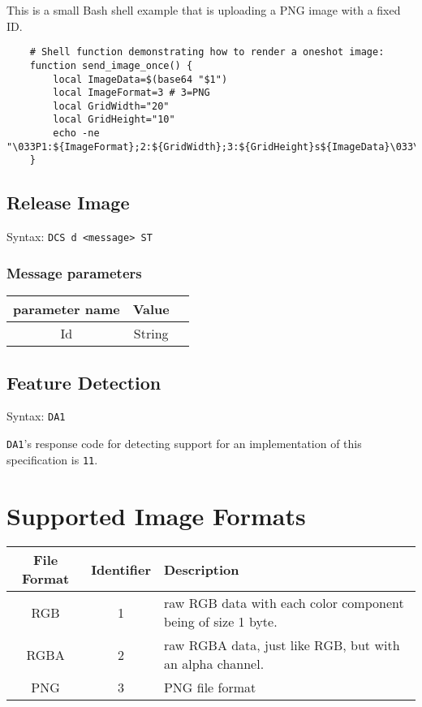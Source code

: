 \documentclass[a4paper]{article}
\newcommand{\code}[1]{\colorbox{light-gray}{\texttt{#1}}}
\newcommand{\DA}{\code{DA1}}
\begin{document}
This is a small Bash shell example that is uploading a PNG image with a fixed ID.

\begin{verbatim}
    # Shell function demonstrating how to render a oneshot image:
    function send_image_once() {
        local ImageData=$(base64 "$1")
        local ImageFormat=3 # 3=PNG
        local GridWidth="20"
        local GridHeight="10"
        echo -ne "\033P1:${ImageFormat};2:${GridWidth};3:${GridHeight}s${ImageData}\033\\"
    }
\end{verbatim}

\subsection{Release Image}

Syntax: \code{DCS d <message> ST}

\subsubsection*{Message parameters}

\begin{tabular}{ |c|c|l| }
    \hline
    \textbf{parameter name}   & \textbf{Value} \\
    \hline
    Id          & String \\
    \hline
\end{tabular}

\subsection{Feature Detection}

Syntax: \DA

\DA's response code for detecting support for an implementation of this specification is \code{11}.

\section{Supported Image Formats} %

\label{sec:supported-image-formtats}

\begin{tabular}{c | c | l}
    File Format & Identifier & Description \\ \hline
    RGB         & 1          & raw RGB data with each color component being of size 1 byte. \\
    RGBA        & 2          & raw RGBA data, just like RGB, but with an alpha channel. \\
    PNG         & 3          & PNG file format \\
\end{tabular}
\end{document}

